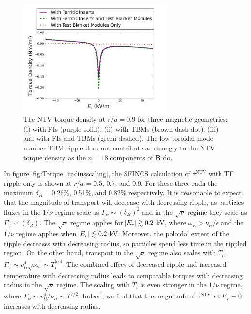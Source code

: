 \documentclass[aip, pop, preprint]{revtex4-1}
\numberwithin{figure}{section}
\numberwithin{equation}{section}
\begin{document}
\begin{figure}[h!]
\centering
\includegraphics[width=0.7\textwidth]{Torque_comparingTBMandFI.png}
\caption{\label{fig:Torque_comparingTBMandFI} The NTV torque density at $r/a = 0.9$ for three magnetic geometries: (i) with FIs (purple solid), (ii) with TBMs (brown dash dot), (iii) and with FIs and TBMs (green dashed). The low toroidal mode number TBM ripple does not contribute as strongly to the NTV torque density as the $n = 18$ components of $\bm{B}$ do.}
\end{figure}

In figure \ref{fig:Torque_radiusscaling}, the SFINCS calculation of $\tau^{\text{NTV}}$ with TF ripple only is shown at $r/a$ = 0.5, 0.7, and 0.9. For these three radii the maximum $\delta_B = 0.26\%$,  0.51\%, and 0.82\% respectively. It is reasonable to expect that the magnitude of transport will decrease with decreasing ripple, as particles fluxes in the $1/\nu$ regime scale as $\Gamma_{\psi} \sim (\delta_B)^2$\cite{Shaing2003} and in the $\sqrt{\nu}$ regime they scale as $ \Gamma_{\psi}\sim (\delta_B)$.\cite{Shaing2008} The $\sqrt{\nu}$ regime applies for $\abs{E_r} \gtrsim 0.2$ kV, where $\omega_E > \nu_{ii}/\epsilon$ and the $1/\nu$ regime applies when $\abs{E_r} \lesssim 0.2$ kV. Moreover, the poloidal extent of the ripple decreases with decreasing radius, so particles spend less time in the rippled region. On the other hand, transport in the $\sqrt{\nu}$ regime also scales with $T_i$, $\Gamma_{\psi} \sim v_{ti}^4 \sqrt{\nu_{ii}} \sim T_i^{5/4}$. The combined effect of decreased ripple and increased temperature with decreasing radius leads to comparable torques with decreasing radius in the $\sqrt{\nu}$ regime. The scaling with $T_i$ is even stronger in the $1/\nu$ regime, where $\Gamma_{\psi} \sim v_{ti}^4/\nu_{ii} \sim T^{7/2}$. Indeed, we find that the magnitude of $\tau^{\text{NTV}}$ at $E_r = 0$ increases with decreasing radius. 
\end{document}
